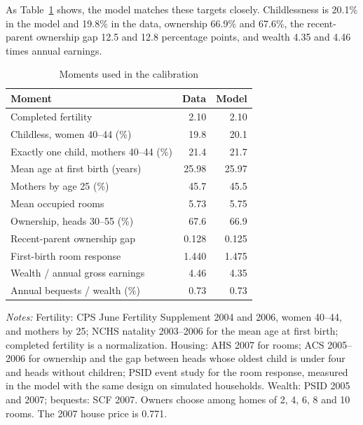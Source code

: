 As Table~\ref{tab:quant-moments} shows, the model matches
these targets closely. Childlessness is 20.1\% in the model and 19.8\% in
the data, ownership 66.9\% and 67.6\%, the recent-parent ownership gap 12.5
and 12.8 percentage points, and wealth 4.35 and 4.46 times annual earnings.

\begin{table}[!htbp]
\centering
\caption{Moments used in the calibration}
\label{tab:quant-moments}
\small
\begin{tabularx}{0.8\textwidth}{@{}X r r@{}}
\toprule
Moment & Data & Model \\
\midrule
Completed fertility & 2.10 & 2.10 \\
Childless, women 40--44 (\%) & 19.8 & 20.1 \\
Exactly one child, mothers 40--44 (\%) & 21.4 & 21.7 \\
Mean age at first birth (years) & 25.98 & 25.97 \\
Mothers by age 25 (\%) & 45.7 & 45.5 \\
\addlinespace
Mean occupied rooms & 5.73 & 5.75 \\
Ownership, heads 30--55 (\%) & 67.6 & 66.9 \\
Recent-parent ownership gap & 0.128 & 0.125 \\
First-birth room response & 1.440 & 1.475 \\
\addlinespace
Wealth / annual gross earnings & 4.46 & 4.35 \\
Annual bequests / wealth (\%) & 0.73 & 0.73 \\
\bottomrule
\end{tabularx}
\par\smallskip
\begin{minipage}{0.95\linewidth}
\footnotesize\textit{Notes:} Fertility: CPS June Fertility
Supplement 2004 and 2006, women 40--44, and mothers by 25; NCHS natality 2003--2006 for the mean age at first birth;
completed fertility is a normalization. Housing: AHS 2007 for rooms; ACS
2005--2006 for ownership and the gap between heads whose oldest child is
under four and heads without children; PSID event study for the room
response, measured in the model with the same design on simulated
households. Wealth: PSID 2005 and 2007; bequests: SCF 2007. Owners choose
among homes of 2, 4, 6, 8 and 10 rooms. The 2007 house price is 0.771.
\end{minipage}
\end{table}




